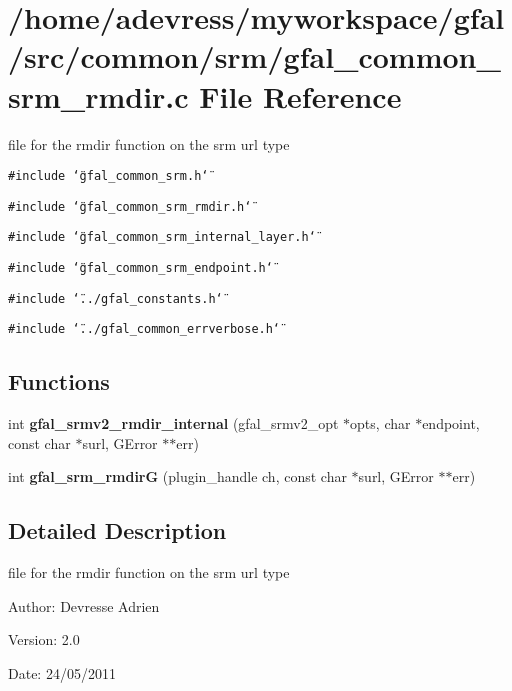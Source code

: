 \section{/home/adevress/myworkspace/gfal/src/common/srm/gfal\_\-common\_\-srm\_\-rmdir.c File Reference}
\label{gfal__common__srm__rmdir_8c}
file for the rmdir function on the srm url type 

{\tt \#include \char`\"{}gfal\_\-common\_\-srm.h\char`\"{}}\par
{\tt \#include \char`\"{}gfal\_\-common\_\-srm\_\-rmdir.h\char`\"{}}\par
{\tt \#include \char`\"{}gfal\_\-common\_\-srm\_\-internal\_\-layer.h\char`\"{}}\par
{\tt \#include \char`\"{}gfal\_\-common\_\-srm\_\-endpoint.h\char`\"{}}\par
{\tt \#include \char`\"{}../gfal\_\-constants.h\char`\"{}}\par
{\tt \#include \char`\"{}../gfal\_\-common\_\-errverbose.h\char`\"{}}\par
\subsection*{Functions}
\begin{CompactItemize}
\item 
int \textbf{gfal\_\-srmv2\_\-rmdir\_\-internal} (gfal\_\-srmv2\_\-opt $\ast$opts, char $\ast$endpoint, const char $\ast$surl, GError $\ast$$\ast$err)\label{gfal__common__srm__rmdir_8c_f00f2e024abada581220fa7aaa698101}

\item 
int \textbf{gfal\_\-srm\_\-rmdir\-G} (plugin\_\-handle ch, const char $\ast$surl, GError $\ast$$\ast$err)\label{gfal__common__srm__rmdir_8c_254089301fb224990c5fa0c98e800554}

\end{CompactItemize}


\subsection{Detailed Description}
file for the rmdir function on the srm url type 

\begin{Desc}
\item[Author:]Devresse Adrien \end{Desc}
\begin{Desc}
\item[Version:]2.0 \end{Desc}
\begin{Desc}
\item[Date:]24/05/2011 \end{Desc}
